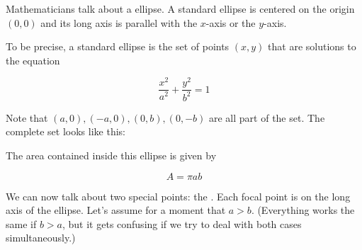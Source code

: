 Mathematicians talk about a  ellipse. A standard ellipse is
centered on the origin $(0,0)$ and its long axis is parallel with the
$x$-axis or the $y$-axis.

\begin{mdframed}[style=important, frametitle={Equation for a Standard Ellipse}]

To be precise, a standard ellipse is the set of points $(x, y)$ that
are solutions to the equation

$$\frac{x^2}{a^2} + \frac{y^2}{b^2} = 1$$


Note that $(a,0), (-a, 0), (0, b), (0,-b)$ are all part of the
set. The complete set looks like this:

{}

The area contained inside this ellipse is given by

$$A = \pi a b$$


\end{mdframed}


We can now talk about two special points: the . Each
focal point is on the long axis of the ellipse. Let's assume for a
moment that $a > b$. (Everything works the same if $b > a$, but it
gets confusing if we try to deal with both cases simultaneously.)

